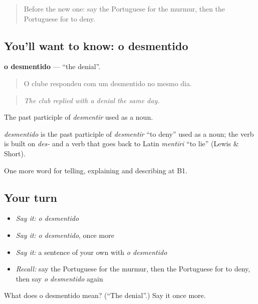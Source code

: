 \begin{quote}
Before the new one: say the Portuguese for the murmur, then the Portuguese for to deny.
\end{quote}

\subsection*{You'll want to know: o desmentido}
\textbf{o desmentido} — \textquotedblleft{}the denial\textquotedblright{}.

\begin{quote}
O clube respondeu com um desmentido no mesmo dia.
\end{quote}

\begin{quote}
\emph{The club replied with a denial the same day.}
\end{quote}

The past participle of \emph{desmentir} used as a noun.

\begin{cousinweb}
\emph{desmentido} is the past participle of \emph{desmentir} \textquotedblleft{}to deny\textquotedblright{} used as a noun; the verb is built on \emph{des-} and a verb that goes back to Latin \emph{mentīrī} \textquotedblleft{}to lie\textquotedblright{} (Lewis \& Short).
\end{cousinweb}

\begin{grammarlens}[title={What you've built}]
One more word for telling, explaining and describing at B1.
\end{grammarlens}

\subsection*{Your turn}
\begin{itemize}
\raggedright
  \item \emph{Say it:} \emph{o desmentido}
  \item \emph{Say it:} \emph{o desmentido}, once more
  \item \emph{Say it:} a sentence of your own with \emph{o desmentido}
  \item \emph{Recall:} say the Portuguese for the murmur, then the Portuguese for to deny, then say \emph{o desmentido} again
\end{itemize}

\begin{tcolorbox}[breakable,colback=teal!4,colframe=teal!35!black,title={Before you move on}]
What does o desmentido mean? (\textquotedblleft{}The denial\textquotedblright{}.) Say it once more.
\end{tcolorbox}
